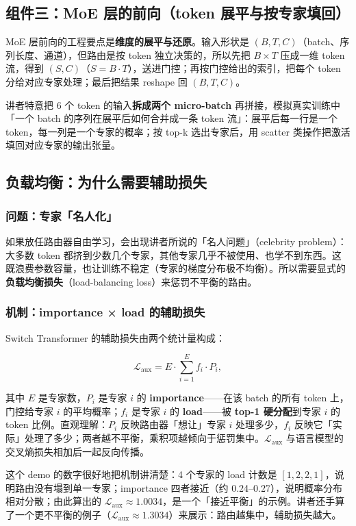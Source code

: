 \subsection{组件三：MoE 层的前向（token 展平与按专家填回）}

MoE 层前向的工程要点是\textbf{维度的展平与还原}。输入形状是 $(B,T,C)$（batch、序列长度、通道），但路由是按 token 独立决策的，所以先把 $B\times T$ 压成一维 token 流，得到 $(S,C)$（$S=B\cdot T$），送进门控；再按门控给出的索引，把每个 token 分给对应专家处理；最后把结果 reshape 回 $(B,T,C)$。

讲者特意把 6 个 token 的输入\textbf{拆成两个 micro-batch} 再拼接，模拟真实训练中「一个 batch 的序列在展平后如何合并成一条 token 流」：展平后每一行是一个 token，每一列是一个专家的概率；按 top-k 选出专家后，用 scatter 类操作把激活填回对应专家的输出张量。

\subsection{负载均衡：为什么需要辅助损失}

\subsubsection{问题：专家「名人化」}

如果放任路由器自由学习，会出现讲者所说的「名人问题」（celebrity problem）：大多数 token 都挤到少数几个专家，其他专家几乎不被使用、也学不到东西。这既浪费参数容量，也让训练不稳定（专家的梯度分布极不均衡）。所以需要显式的\textbf{负载均衡损失}（load-balancing loss）来惩罚不平衡的路由。

\subsubsection{机制：importance × load 的辅助损失}

Switch Transformer 的辅助损失由两个统计量构成：

$$
\mathcal{L}_{\text{aux}} = E\cdot\sum_{i=1}^{E} f_i\cdot P_i,
$$

其中 $E$ 是专家数，$P_i$ 是专家 $i$ 的 \textbf{importance}——在该 batch 的所有 token 上，门控给专家 $i$ 的平均概率；$f_i$ 是专家 $i$ 的 \textbf{load}——被 \textbf{top-1 硬分配}到专家 $i$ 的 token 比例。直观理解：$P_i$ 反映路由器「想让」专家 $i$ 处理多少，$f_i$ 反映它「实际」处理了多少；两者越不平衡，乘积项越倾向于惩罚集中。$\mathcal{L}_{\text{aux}}$ 与语言模型的交叉熵损失相加后一起反向传播。

这个 demo 的数字很好地把机制讲清楚：4 个专家的 load 计数是 $[1,2,2,1]$，说明路由没有塌到单一专家；importance 四者接近（约 0.24--0.27），说明概率分布相对分散；由此算出的 $\mathcal{L}_{\text{aux}}\approx1.0034$，是一个「接近平衡」的示例。讲者还手算了一个更不平衡的例子（$\mathcal{L}_{\text{aux}}\approx1.3034$）来展示：路由越集中，辅助损失越大。

